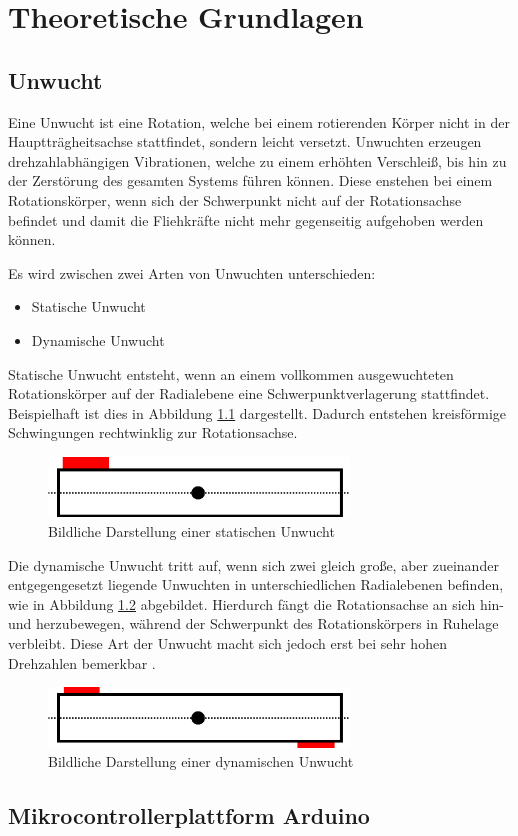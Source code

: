 
\chapter{Theoretische Grundlagen}

\section{Unwucht}
Eine Unwucht ist eine Rotation, welche bei einem rotierenden Körper nicht in der Hauptträgheitsachse stattfindet, sondern leicht versetzt.
Unwuchten erzeugen drehzahlabhängigen Vibrationen, welche zu einem erhöhten Verschleiß, bis hin zu der Zerstörung des gesamten Systems führen können.
Diese enstehen bei einem Rotationskörper, wenn sich der Schwerpunkt nicht auf der Rotationsachse befindet und damit die Fliehkräfte nicht mehr gegenseitig aufgehoben werden können. \cite{unwucht_wiki:2011}

Es wird zwischen zwei Arten von Unwuchten unterschieden:
\begin{itemize}
    \item Statische Unwucht
    \item Dynamische Unwucht
\end{itemize}

Statische Unwucht entsteht, wenn an einem vollkommen ausgewuchteten Rotationskörper auf der Radialebene eine Schwerpunktverlagerung stattfindet. Beispielhaft ist dies in Abbildung \ref{fig:static_imbalance} dargestellt.
Dadurch entstehen kreisförmige Schwingungen rechtwinklig zur Rotationsachse.
\begin{figure}[H]
    \centering
    \includegraphics[width=8cm]{images/chapter/02/static_imbalance.png}
    \caption{Bildliche Darstellung einer statischen Unwucht}
    \label{fig:static_imbalance}
\end{figure}

Die dynamische Unwucht tritt auf, wenn sich zwei gleich große, aber zueinander entgegengesetzt liegende Unwuchten in unterschiedlichen Radialebenen befinden, wie in Abbildung \ref{fig:dynamic_imbalance} abgebildet.
Hierdurch fängt die Rotationsachse an sich hin- und herzubewegen, während der Schwerpunkt des Rotationskörpers in Ruhelage verbleibt.
Diese Art der Unwucht macht sich jedoch erst bei sehr hohen Drehzahlen bemerkbar \cite[S. 8]{vibromatrix:2007}.
\begin{figure}[H]
    \centering
    \includegraphics[width=8cm]{images/chapter/02/dynamic_imbalance.png}
    \caption{Bildliche Darstellung einer dynamischen Unwucht}
    \label{fig:dynamic_imbalance}
\end{figure}

\section{Mikrocontrollerplattform Arduino}
